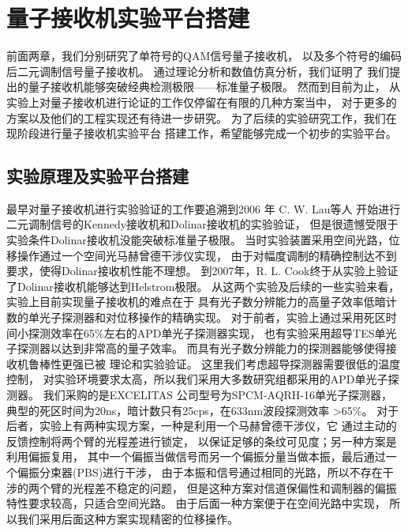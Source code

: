 \chapter{量子接收机实验平台搭建}
前面两章，我们分别研究了单符号的QAM信号量子接收机，
以及多个符号的编码后二元调制信号量子接收机。
通过理论分析和数值仿真分析，我们证明了
我们提出的量子接收机能够突破经典检测极限——标准量子极限。
然而到目前为止，
从实验上对量子接收机进行论证的工作仅停留在有限的几种方案当中，
对于更多的方案以及他们的工程实现还有待进一步研究。
为了后续的实验研究工作，我们在现阶段进行量子接收机实验平台
搭建工作，希望能够完成一个初步的实验平台。


\section{实验原理及实验平台搭建}
最早对量子接收机进行实验验证的工作要追溯到2006 年 C. W. Lau等人
开始进行二元调制信号的Kennedy接收机和Dolinar接收机的实验验证\cite{lau2006binary}，
但是很遗憾受限于实验条件Dolinar接收机没能突破标准量子极限。
当时实验装置采用空间光路，位移操作通过一个空间光马赫曾德干涉仪实现，
由于对幅度调制的精确控制达不到要求，使得Dolinar接收机性能不理想。
到2007年，R. L. Cook终于从实验上验证了Dolinar接收机能够达到Helstrom极限\cite{cook2007optical}。
从这两个实验及后续的一些实验来看\cite{wittmann2008demonstration,wittmann2010demonstration,tsujino2010sub,
tsujino2011quantum,becerra2011m,chen2012optical,muller2012quadrature,becerra2013experimental,
becerra2015photon}，
实验上目前实现量子接收机的难点在于
具有光子数分辨能力的高量子效率低暗计数的单光子探测器和对位移操作的精确实现。
对于前者，实验上通过采用死区时间小探测效率在65\%左右的APD单光子探测器实现，
也有实验采用超导TES单光子探测器以达到非常高的量子效率\cite{tsujino2011quantum}。
而具有光子数分辨能力的探测器能够使得接收机鲁棒性更强已被
理论和实验验证\cite{izumi2013quantum,li2013suppressing,becerra2015photon}。
这里我们考虑超导探测器需要很低的温度控制，
对实验环境要求太高，所以我们采用大多数研究组都采用的APD单光子探测器。
我们采购的是EXCELITAS 公司型号为SPCM-AQRH-16单光子探测器，
典型的死区时间为20ns，暗计数只有25cps，在633nm波段探测效率
>65\%。
对于后者，实验上有两种实现方案，一种是利用一个马赫曾德干涉仪，它
通过主动的反馈控制将两个臂的光程差进行锁定，
以保证足够的条纹可见度\cite{becerra2013experimental,
becerra2015photon}；另一种方案是利用偏振复用，
其中一个偏振当做信号而另一个偏振分量当做本振，最后通过一个偏振分束器(PBS)进行干涉\cite{wittmann2008demonstration,wittmann2010demonstration}，
由于本振和信号通过相同的光路，所以不存在干涉的两个臂的光程差不稳定的问题，
但是这种方案对信道保偏性和调制器的偏振特性要求较高，只适合空间光路。
由于后面一种方案便于在空间光路中实现，
所以我们采用后面这种方案实现精密的位移操作。


